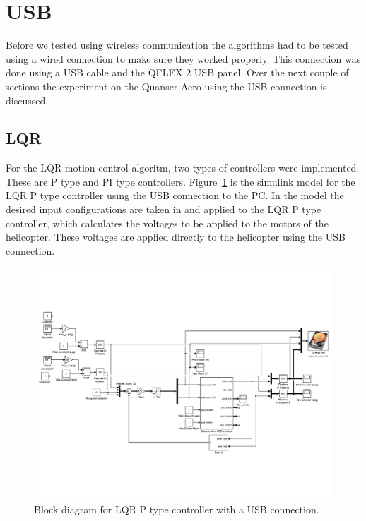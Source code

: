 \section{USB}
Before we tested using wireless communication the algorithms had to be tested using a wired connection to make sure they worked properly.  This connection was done using a USB cable and the QFLEX 2 USB panel.  Over the next couple of sections the experiment on the Quanser Aero using the USB connection is discussed.
\subsection{LQR}
For the LQR motion control algoritm, two types of controllers were implemented.  These are P type and PI type controllers.  Figure~\ref{fig:LQR_P_USB_Block_Diagram} is the simulink model for the LQR P type controller using the USB connection to the PC.  In the model the desired input configurations are taken in and applied to the LQR P type controller, which calculates the voltages to be applied to the motors of the helicopter.  These voltages are applied directly to the helicopter using the USB connection.
\begin{figure}[!htbp]
    \centering
    \includegraphics[width=.8\textwidth,keepaspectratio=true]{figs/img/LQR_USB}
    \caption{Block diagram for LQR P type controller with a USB connection.}
    \label{fig:LQR_P_USB_Block_Diagram}
\end{figure}

